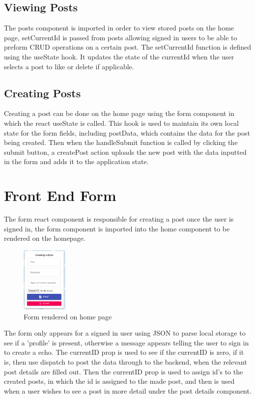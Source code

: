 \subsection{Viewing Posts}
The posts component is imported in order to view stored posts on the home page, setCurrentId is passed from posts allowing signed in users to be able to preform CRUD operations on a certain post. The setCurrentId function is defined using the useState hook. It updates the state of the currentId when the user selects a post to like or delete if applicable.

\subsection{Creating Posts}
Creating a post can be done on the home page using the form component in which the react useState is called. This hook is used to maintain its own local state for the form fields, including postData, which contains the data for the post being created. Then when the handleSubmit function is called by clicking the submit button, a createPost action uploads the new post with the data inputted in the form and adds it to the application state.

\section{Front End Form}
The form react component is responsible for creating a post once the user is signed in, the form component is imported into the home component to be rendered on the homepage.
\begin{figure}[h!]
    \centering
    \includegraphics[width=0.2\textwidth]{images/form.png}
    \caption{Form rendered on home page}
    \label{image:Form}
\end{figure}
\newline
The form only appears for a signed in user using JSON to parse local storage to see if a 'profile' is present, otherwise a message appears telling the user to sign in to create a echo. The currentID prop is used to see if the currentID is zero, if it is, then use dispatch to post the data through to the backend, when the relevant post details are filled out. Then the currentID prop is used to assign id's to the created posts, in which the id is assigned to the made post, and then  is used when a user wishes to see a post in more detail under the post details component.

